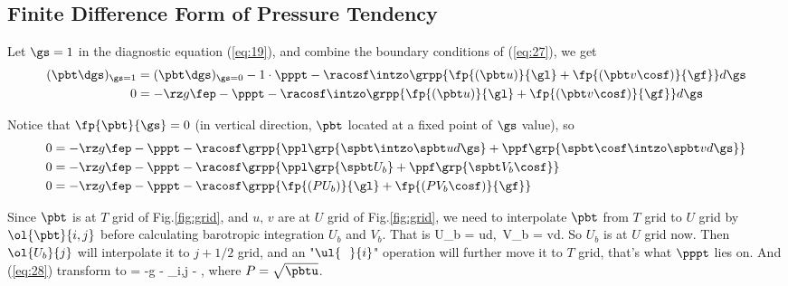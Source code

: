 \subsection{Finite Difference Form of Pressure Tendency}\label{der:pre-tend}

Let $\gs=1$ in the diagnostic equation (\ref{eq:19}), and combine the boundary
conditions of (\ref{eq:27}), we get
\begin{align}
(\pbt\dgs)_{\gs=1} &= (\pbt\dgs)_{\gs=0} -1\cdot\pppt - \racosf \intzo \grpp{ \fp{(\pbt u)}{\gl} + \fp{(\pbt v\cosf)}{\gf} }d\gs\\
0 &= -\rz g \fep - \pppt - \racosf \intzo \grpp{ \fp{(\pbt u)}{\gl} + \fp{(\pbt
v\cosf)}{\gf} }d\gs
\end{align}

Notice that $\fp{\pbt}{\gs}=0$ (in vertical direction, $\pbt$ located at a fixed
point of $\gs$ value), so
\begin{align}
0 &= -\rz g \fep - \pppt - \racosf \grpp{ \ppl\grp{\spbt\intzo\spbt ud\gs} +
\ppf \grp{\spbt\cosf\intzo\spbt vd\gs} }\\
0 &= -\rz g \fep - \pppt - \racosf \grpp{ \ppl\grp{\spbt U_b} +
\ppf \grp{\spbt V_b\cosf} }\\
0 &= -\rz g \fep - \pppt - \racosf \grpp{ \fp{(P U_b)}{\gl} + \fp{(P V_b\cosf
)}{\gf} }\label{eq:28}
\end{align}

Since $\pbt$ is at $T$ grid of Fig.\ref{fig:grid}, and $u,\,v$ are at $U$ grid
of Fig.\ref{fig:grid}, we need to interpolate $\pbt$ from $T$ grid to $U$ grid
by $\ol{\pbt}{i,j}$ before calculating barotropic integration $U_b$ and $V_b$.
That is
\beeq
U_b = \intzo\sqrt{\pbtu} ud\gs,\,
V_b = \intzo\sqrt{\pbtu} vd\gs.
\eneq
So $U_b$ is at $U$ grid now. Then $\ol{U_b}{j}$ will interpolate it to $j+1/2$
grid, and an "$\ul{\,\,\,\,}{i}$" operation will further move it to $T$ grid, that's
what $\pppt$ lies on. And (\ref{eq:28}) transform to
 = -\rz g \fep - \grpp{\pppt}_{i,j} - 
\racosfj {},
\eneq
where $P=\sqrt{\pbtu}$.

